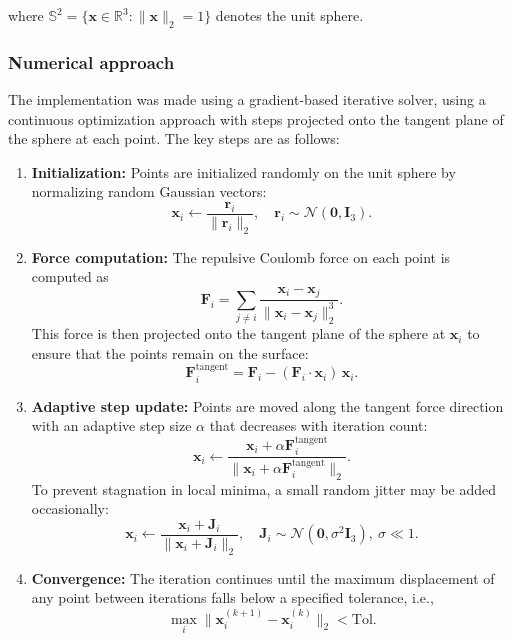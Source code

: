 where $\mathbb{S}^2 = \{\mathbf{x} \in \mathbb{R}^3 : \|\mathbf{x}\|_2 = 1\}$ denotes the unit sphere.

\subsubsection{Numerical approach}

The implementation was made using a gradient-based iterative solver, using a continuous optimization approach with steps projected onto the tangent plane of the sphere at each point. The key steps are as follows:

\begin{enumerate}
    \item \textbf{Initialization:} Points are initialized randomly on the unit sphere by normalizing random Gaussian vectors:
    \begin{equation}
    \mathbf{x}_i \leftarrow \frac{\mathbf{r}_i}{\|\mathbf{r}_i\|_2}, \quad \mathbf{r}_i \sim \mathcal{N}(\mathbf{0}, \mathbf{I}_3).
    \end{equation}

    \item \textbf{Force computation:} The repulsive Coulomb force on each point is computed as
    \begin{equation}
    \mathbf{F}_i = \sum_{j \neq i} \frac{\mathbf{x}_i - \mathbf{x}_j}{\|\mathbf{x}_i - \mathbf{x}_j\|_2^3}.
    \end{equation}
    This force is then projected onto the tangent plane of the sphere at $\mathbf{x}_i$ to ensure that the points remain on the surface:
    \begin{equation}
    \mathbf{F}_i^{\text{tangent}} = \mathbf{F}_i - (\mathbf{F}_i \cdot \mathbf{x}_i)\, \mathbf{x}_i.
    \end{equation}

    \item \textbf{Adaptive step update:} Points are moved along the tangent force direction with an adaptive step size $\alpha$ that decreases with iteration count:
    \begin{equation}
    \mathbf{x}_i \leftarrow \frac{\mathbf{x}_i + \alpha \mathbf{F}_i^{\text{tangent}}}{\|\mathbf{x}_i + \alpha \mathbf{F}_i^{\text{tangent}}\|_2}.
    \end{equation}
    To prevent stagnation in local minima, a small random jitter may be added occasionally:
    \begin{equation}
    \mathbf{x}_i \leftarrow \frac{\mathbf{x}_i + \mathbf{J}_i}{\|\mathbf{x}_i + \mathbf{J}_i\|_2}, \quad \mathbf{J}_i \sim \mathcal{N}(\mathbf{0}, \sigma^2 \mathbf{I}_3), \ \sigma \ll 1.
    \end{equation}

    \item \textbf{Convergence:} The iteration continues until the maximum displacement of any point between iterations falls below a specified tolerance, i.e.,
    \begin{equation}
    \max_i \|\mathbf{x}_i^{(k+1)} - \mathbf{x}_i^{(k)}\|_2 < \text{Tol}.
    \end{equation}
\end{enumerate}

